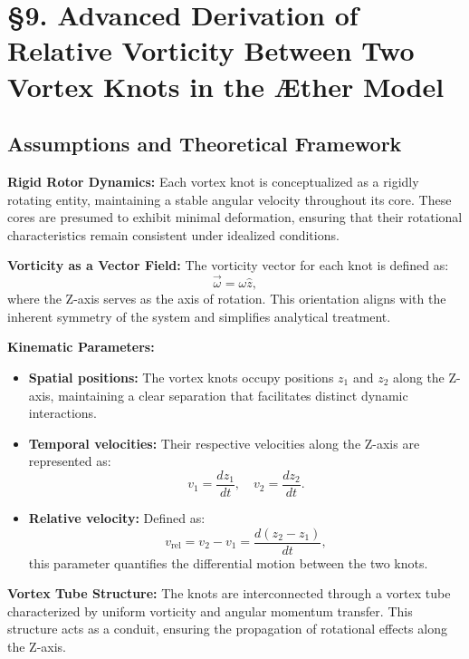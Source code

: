 

    \section*{§9. Advanced Derivation of Relative Vorticity Between Two Vortex Knots in the Æther Model}

    \subsection*{Assumptions and Theoretical Framework}
    \textbf{Rigid Rotor Dynamics:} Each vortex knot is conceptualized as a rigidly rotating entity, maintaining a stable angular velocity throughout its core. These cores are presumed to exhibit minimal deformation, ensuring that their rotational characteristics remain consistent under idealized conditions.

    \textbf{Vorticity as a Vector Field:} The vorticity vector for each knot is defined as:
    \begin{equation}
        \vec{\omega} = \omega \hat{z},
    \end{equation}
    where the Z-axis serves as the axis of rotation. This orientation aligns with the inherent symmetry of the system and simplifies analytical treatment.

    \textbf{Kinematic Parameters:}
    \begin{itemize}
        \item \textbf{Spatial positions:} The vortex knots occupy positions $z_1$ and $z_2$ along the Z-axis, maintaining a clear separation that facilitates distinct dynamic interactions.
        \item \textbf{Temporal velocities:} Their respective velocities along the Z-axis are represented as:
        \begin{equation}
            v_1 = \frac{dz_1}{dt}, \quad v_2 = \frac{dz_2}{dt}.
        \end{equation}
        \item \textbf{Relative velocity:} Defined as:
        \begin{equation}
            v_{\text{rel}} = v_2 - v_1 = \frac{d(z_2 - z_1)}{dt},
        \end{equation}
        this parameter quantifies the differential motion between the two knots.
    \end{itemize}

    \textbf{Vortex Tube Structure:} The knots are interconnected through a vortex tube characterized by uniform vorticity and angular momentum transfer. This structure acts as a conduit, ensuring the propagation of rotational effects along the Z-axis.

